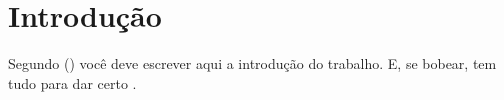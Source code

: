 %
%
%

\chapter{Introdução}
\label{sec:intro}

Segundo  (\citeyear{Graham1994}) você deve escrever
aqui a introdução do trabalho. E, se bobear, tem tudo para dar certo
\cite{Thompson1998}.

